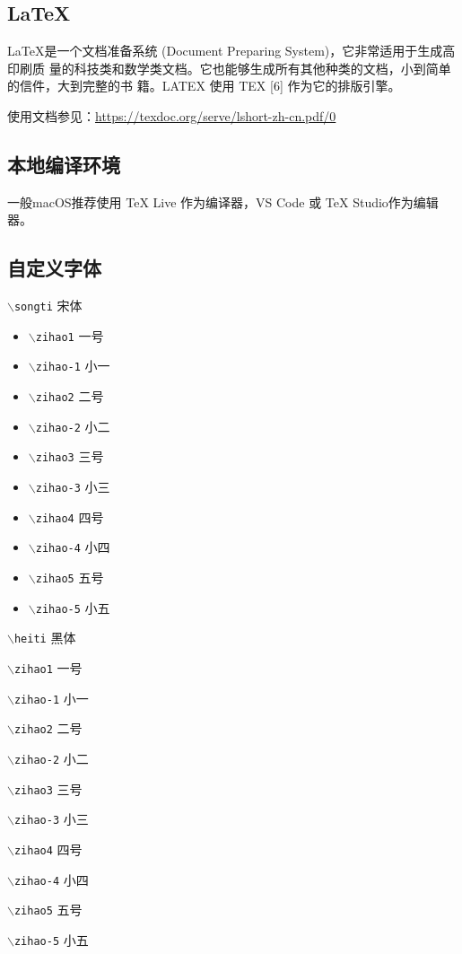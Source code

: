 \documentclass[UTF8,a4paper,autofakebold,15pt]{ctexart}
\begin{document}
\subsection{\LaTeX}
	\LaTeX 是一个文档准备系统 (Document Preparing System)，它非常适用于生成高印刷质 量的科技类和数学类文档。它也能够生成所有其他种类的文档，小到简单的信件，大到完整的书 籍。LATEX 使用 TEX [6] 作为它的排版引擎。

	使用文档参见：\href{https://texdoc.org/serve/lshort-zh-cn.pdf/0}{https://texdoc.org/serve/lshort-zh-cn.pdf/0}

\subsection{本地编译环境}

	一般macOS推荐使用 TeX Live 作为编译器，VS Code 或 TeX Studio作为编辑器。

\subsection{自定义字体}

	{\tt $\backslash$songti} {\songti 宋体}
	\begin{itemize}
		\item {\tt$\backslash$zihao{1}} { 一号}
		\item {\tt$\backslash$zihao{-1}} { 小一}
		\item {\tt$\backslash$zihao{2}} { 二号}
		\item {\tt$\backslash$zihao{-2}} { 小二}
		\item {\tt$\backslash$zihao{3}} { 三号}
		\item {\tt$\backslash$zihao{-3}} { 小三}
		\item {\tt$\backslash$zihao{4}} { 四号}
		\item {\tt$\backslash$zihao{-4}} { 小四}
		\item {\tt$\backslash$zihao{5}} { 五号}
		\item {\tt$\backslash$zihao{-5}} { 小五}
	\end{itemize}

	{\tt $\backslash$heiti} {\heiti 黑体}
	\begin{itemize}{\heiti
		\item {\tt$\backslash$zihao{1}} { 一号}
		\item {\tt$\backslash$zihao{-1}} { 小一}
		\item {\tt$\backslash$zihao{2}} { 二号}
		\item {\tt$\backslash$zihao{-2}} { 小二}
		\item {\tt$\backslash$zihao{3}} { 三号}
		\item {\tt$\backslash$zihao{-3}} { 小三}
		\item {\tt$\backslash$zihao{4}} { 四号}
		\item {\tt$\backslash$zihao{-4}} { 小四}
		\item {\tt$\backslash$zihao{5}} { 五号}
		\item {\tt$\backslash$zihao{-5}} { 小五}}
	\end{itemize}
\end{document}
